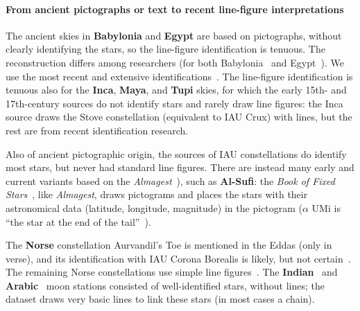 \documentclass[10pt]{article}
\begin{document}
\paragraph{From ancient pictographs or text to recent line-figure interpretations} The ancient skies in {\bf Babylonia} and {\bf Egypt} are based on pictographs, without clearly identifying the stars, so the line-figure identification is tenuous. The reconstruction differs among researchers (for both Babylonia~\cite{rogers1998origins1,hoffmann2018drawing} and Egypt~\cite{lull2009constellations}). We use the most recent and extensive identifications~\cite{hoffmann2017hipparchs,hoffmann2017history,hoffmann2018drawing,lull2009constellations}. The line-figure identification is tenuous also for the {\bf Inca}, {\bf Maya}, and {\bf Tupi} skies, for which the early 15th- and 17th-century sources do not identify stars and rarely draw line figures: the Inca source draws the Stove constellation (equivalent to IAU Crux) with lines, but the rest are from recent identification research.

Also of ancient pictographic origin, the sources of IAU constellations do identify most stars, but never had standard line figures. There are instead many early and current variants based on the \textit{Almagest}~\cite{toomer1984ptolemy}), such as {\bf Al-Sufi}: the \textit{Book of Fixed Stars}~\cite{Al_Sufi_Book}, like \textit{Almagest}, draws pictograms and places the stars with their astronomical data (latitude, longitude, magnitude) in the pictogram ($\alpha$ UMi is ``the star at the end of the tail''~\cite{toomer1984ptolemy}). 

The {\bf Norse} constellation Aurvandil's Toe is mentioned in the Eddas (only in verse), and its identification with IAU Corona Borealis is likely, but not certain~\cite{Stellarium}. The remaining Norse constellations use simple line figures~\cite{kaalund1908alfraedhi,Stellarium}. The {\bf Indian}~\cite{basham1954wonder} and {\bf Arabic}~\cite{kunitzsch2013lunar} moon stations consisted of well-identified stars, without lines; the dataset draws very basic lines to link these stars (in most cases a chain). 
\end{document}
